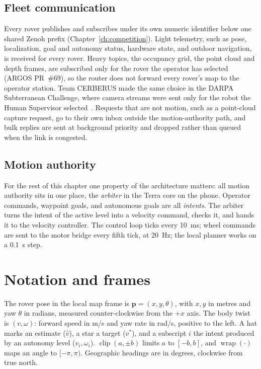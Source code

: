 \subsection{Fleet communication}
\label{sec:arch-topics}

Every rover publishes and subscribes under its own numeric identifier below one shared Zenoh prefix (Chapter~\ref{ch:competition}).
Light telemetry, such as pose, localization, goal and autonomy status, hardware state, and outdoor navigation, is received for every rover.
Heavy topics, the occupancy grid, the point cloud and depth frames, are subscribed only for the rover the operator has selected (ARGOS PR~\#69), so the router does not forward every rover's map to the operator station.
Team CERBERUS made the same choice in the DARPA Subterranean Challenge, where camera streams were sent only for the robot the Human Supervisor selected~\citep{tranzatto2022finals}.
Requests that are not motion, such as a point-cloud capture request, go to their own inbox outside the motion-authority path, and bulk replies are sent at background priority and dropped rather than queued when the link is congested.

\subsection{Motion authority}

For the rest of this chapter one property of the architecture matters: all motion authority sits in one place, the \emph{arbiter} in the Terra core on the phone.
Operator commands, waypoint goals, and autonomous goals are all \emph{intents}.
The arbiter turns the intent of the active level into a velocity command, checks it, and hands it to the velocity controller.
The control loop ticks every 10~ms; wheel commands are sent to the motor bridge every fifth tick, at 20~Hz; the local planner works on a 0.1~s step.

\section{Notation and frames}
\label{sec:auto-notation}

The rover pose in the local map frame is $\mathbf{p} = (x, y, \theta)$, with $x, y$ in metres and yaw $\theta$ in radians, measured counter-clockwise from the $+x$ axis.
The body twist is $(v, \omega)$: forward speed in m/s and yaw rate in rad/s, positive to the left.
A hat marks an estimate ($\hat v$), a star a target ($v^\ast$), and a subscript $i$ the intent produced by an autonomy level ($v_i, \omega_i$).
$\operatorname{clip}(a, \pm b)$ limits $a$ to $[-b, b]$, and $\operatorname{wrap}(\cdot)$ maps an angle to $[-\pi, \pi)$.
Geographic headings are in degrees, clockwise from true north.

